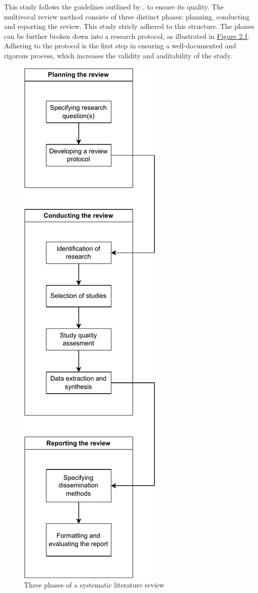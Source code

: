This study follows the guidelines outlined by \cite{kitchenham2007}, to ensure its quality. The multivocal review method consists of three distinct phases: planning, conducting and reporting the review. This study stricly adhered to this structure. The phases can be further broken down into a research protocol, as illustrated in \hyperref[fig:slrphases]{Figure 2.1}. Adhering to the protocol is the first step in ensuring a well-documented and rigorous process, which increases the validity and auditability of the study.

\begin{figure}
	\centering
	\includegraphics[scale=0.9]{figures/slr-phases.pdf}
	\caption{Three phases of a systematic literature review}
	\label{fig:slrphases}
\end{figure}

